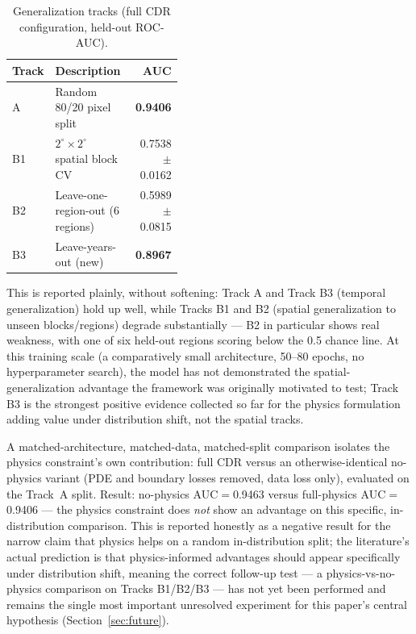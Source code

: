 \documentclass[journal]{IEEEtran}
\begin{document}
\begin{table}[t]
\centering
\caption{Generalization tracks (full CDR configuration, held-out ROC-AUC).}
\label{tab:tracks}
\begin{tabular}{lp{0.42\linewidth}r}
\toprule
\textbf{Track} & \textbf{Description} & \textbf{AUC} \\
\midrule
A & Random 80/20 pixel split & \textbf{0.9406} \\
B1 & $2^{\circ}\times2^{\circ}$ spatial block CV & 0.7538 $\pm$ 0.0162 \\
B2 & Leave-one-region-out (6 regions) & 0.5989 $\pm$ 0.0815 \\
B3 & Leave-years-out (new) & \textbf{0.8967} \\
\bottomrule
\end{tabular}
\end{table}

This is reported plainly, without softening: Track A and Track B3 (temporal generalization) hold up well, while Tracks B1 and B2 (spatial generalization to unseen blocks/regions) degrade substantially --- B2 in particular shows real weakness, with one of six held-out regions scoring below the 0.5 chance line. At this training scale (a comparatively small architecture, 50--80 epochs, no hyperparameter search), the model has not demonstrated the spatial-generalization advantage the framework was originally motivated to test; Track B3 is the strongest positive evidence collected so far for the physics formulation adding value under distribution shift, not the spatial tracks.

A matched-architecture, matched-data, matched-split comparison isolates the physics constraint's own contribution: full CDR versus an otherwise-identical no-physics variant (PDE and boundary losses removed, data loss only), evaluated on the Track~A split. Result: no-physics AUC$=$0.9463 versus full-physics AUC$=$0.9406 --- the physics constraint does \emph{not} show an advantage on this specific, in-distribution comparison. This is reported honestly as a negative result for the narrow claim that physics helps on a random in-distribution split; the literature's actual prediction \cite{read2019,karniadakis2021} is that physics-informed advantages should appear specifically under distribution shift, meaning the correct follow-up test --- a physics-vs-no-physics comparison on Tracks B1/B2/B3 --- has not yet been performed and remains the single most important unresolved experiment for this paper's central hypothesis (Section~\ref{sec:future}).
\end{document}
